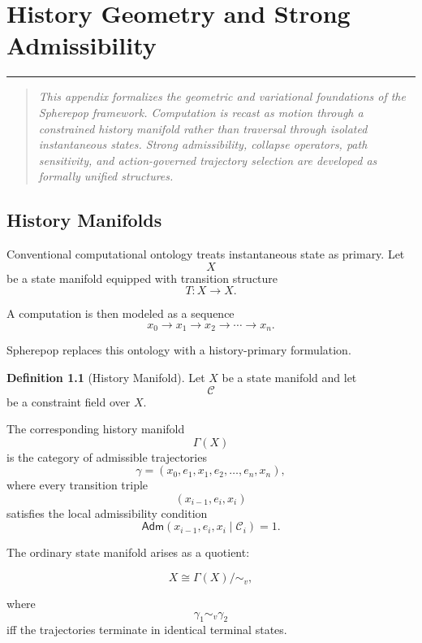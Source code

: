 \documentclass[12pt,openany]{book}
\theoremstyle{plain}
\theoremstyle{definition}
\newtheorem{definition}[theorem]{Definition}
\theoremstyle{remark}
\newcommand{\chapterrule}{%
  \vspace{4pt}%
  {\color{SpherepopBlue}\rule{\textwidth}{0.8pt}}%
  \vspace{10pt}%
}
\newenvironment{chapterprecis}{%
  \begin{quote}\small\itshape}{%
  \end{quote}\medskip}
\begin{document}

\appendix

\chapter{History Geometry and Strong Admissibility}
\chapterrule

\begin{chapterprecis}
This appendix formalizes the geometric and variational foundations
of the Spherepop framework. Computation is recast as motion
through a constrained history manifold rather than traversal
through isolated instantaneous states. Strong admissibility,
collapse operators, path sensitivity, and action-governed
trajectory selection are developed as formally unified structures.
\end{chapterprecis}

\section{History Manifolds}

Conventional computational ontology treats instantaneous state as
primary. Let
\[
X
\]
be a state manifold equipped with transition structure
\[
T : X \to X.
\]

A computation is then modeled as a sequence
\[
x_0 \to x_1 \to x_2 \to \cdots \to x_n.
\]

Spherepop replaces this ontology with a history-primary
formulation.

\begin{definition}[History Manifold]
Let \(X\) be a state manifold and let
\[
\mathcal{C}
\]
be a constraint field over \(X\).

The corresponding history manifold
\[
\Gamma(X)
\]
is the category of admissible trajectories
\[
\gamma
=
(x_0,e_1,x_1,e_2,\ldots,e_n,x_n),
\]
where every transition triple
\[
(x_{i-1},e_i,x_i)
\]
satisfies the local admissibility condition
\[
\mathsf{Adm}(x_{i-1},e_i,x_i \mid \mathcal{C}_i)=1.
\]
\end{definition}

The ordinary state manifold arises as a quotient:

\[
X
\cong
\Gamma(X)/{\sim_v},
\]

where
\[
\gamma_1 \sim_v \gamma_2
\]
iff the trajectories terminate in identical terminal states.
\end{document}
